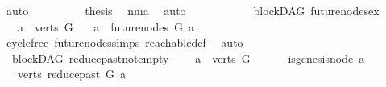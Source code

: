 \begin{isabellebody}
\ auto\isanewline
\ \ \ \ \ \ \isamarkupfalse%
\ \isamarkupfalse%
\ {\isacharquery}{\kern0pt}thesis\ \isamarkupfalse%
\ nma\ \isamarkupfalse%
\ auto\ \ \isanewline
\ \ \ \ \isamarkupfalse%
\isanewline
\ \ \isamarkupfalse%
\isanewline
{}\isamarkupfalse%
%
\endisatagproof
{\isafoldproof}%
%
\isadelimproof
%
\endisadelimproof
%
\isadelimdocument
%
\endisadelimdocument
%
\isatagdocument
%
\isamarkuptrue%
%
\endisatagdocument
{\isafolddocument}%
%
\isadelimdocument
%
\endisadelimdocument
{}\isamarkupfalse%
\ {\isacharparenleft}{\kern0pt}\ blockDAG{\isacharparenright}{\kern0pt}\ future{\isacharunderscore}{\kern0pt}nodes{\isacharunderscore}{\kern0pt}ex{\isacharcolon}{\kern0pt}\isanewline
\ \ \ {\isachardoublequoteopen}a\ {\isasymin}\ verts\ G{\isachardoublequoteclose}\isanewline
\ \ \ {\isachardoublequoteopen}a\ {\isasymnotin}\ future{\isacharunderscore}{\kern0pt}nodes\ G\ a{\isachardoublequoteclose}\isanewline
%
\isadelimproof
\ \ %
\endisadelimproof
%
\isatagproof
{}\isamarkupfalse%
\ cycle{\isacharunderscore}{\kern0pt}free\ future{\isacharunderscore}{\kern0pt}nodes{\isachardot}{\kern0pt}simps\ reachable{\isacharunderscore}{\kern0pt}def\ \isamarkupfalse%
\ auto%
\endisatagproof
{\isafoldproof}%
%
\isadelimproof
%
\endisadelimproof
%
\isadelimdocument
%
\endisadelimdocument
%
\isatagdocument
%
\isamarkuptrue%
%
\endisatagdocument
{\isafolddocument}%
%
\isadelimdocument
%
\endisadelimdocument
{}\isamarkupfalse%
\ {\isacharparenleft}{\kern0pt}\ blockDAG{\isacharparenright}{\kern0pt}\ reduce{\isacharunderscore}{\kern0pt}past{\isacharunderscore}{\kern0pt}not{\isacharunderscore}{\kern0pt}empty{\isacharcolon}{\kern0pt}\isanewline
\ \ \ {\isachardoublequoteopen}\ a\ {\isasymin}\ verts\ G{\isachardoublequoteclose}\isanewline
\ \ \ \ \ \ {\isachardoublequoteopen}{\isasymnot}is{\isacharunderscore}{\kern0pt}genesis{\isacharunderscore}{\kern0pt}node\ a{\isachardoublequoteclose}\isanewline
\ \ \ {\isachardoublequoteopen}{\isacharparenleft}{\kern0pt}verts\ {\isacharparenleft}{\kern0pt}reduce{\isacharunderscore}{\kern0pt}past\ G\ a{\isacharparenright}{\kern0pt}{\isacharparenright}{\kern0pt}\ {\isasymnoteq}\ {\isacharbraceleft}{\kern0pt}{\isacharbraceright}{\kern0pt}{\isachardoublequoteclose}\isanewline
%
\isadelimproof

\end{isabellebody}
